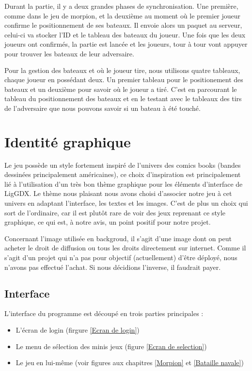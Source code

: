 \documentclass{report}
\begin{document}
Durant la partie, il y a deux grandes phases de synchronisation. Une première, comme dans le jeu de morpion, et la deuxième au moment où le premier joueur confirme le positionnement
de ses bateaux. Il envoie alors un paquet au serveur, celui-ci va stocker l’ID et le tableau des bateaux du joueur. Une fois que les deux joueurs ont confirmés, la partie est lancée et les joueurs, tour à tour vont appuyer pour trouver les bateaux
de leur adversaire.\par{}
Pour la gestion des bateaux et où le joueur tire, nous utilisons quatre tableaux, chaque joueur en possédant deux. Un premier tableau pour le positionement des bateaux et un deuxième pour
savoir où le joueur a tiré. C'est en parcourant le tableau du positionnement des bateaux et en le testant avec le tableaux des tirs de l'adversaire que nous pouvons savoir si un bateau
à été touché.

\chapter{Identité graphique}
Le jeu possède un style fortement inspiré de l'univers des comics books (bandes dessinées principalement américaines),
ce choix d'inspiration est principalement lié à l'utilisation d'un très bon thème graphique pour les éléments
d'interface de LigGDX. Le thème nous plaisant nous avons choisi d'associer notre jeu à cet univers en adaptant l'interface, les
textes et les images. C'est de plus un choix qui sort de l'ordinaire, car il est plutôt rare de voir des jeux
reprenant ce style graphique, ce qui est, à notre avis, un point positif pour notre projet.
\par
Concernant l'image utilisée en backgroud, il s'agit d'une image dont on peut acheter le droit de diffusion ou tous les droits directement sur internet. Comme il s'agit d'un projet qui n'a pas pour objectif (actuellement) d'être déployé, nous n'avons pas effectué l'achat. Si nous décidions l'inverse, il faudrait payer.

\section{Interface}
L'interface du programme est découpé en trois parties principales :

\begin{itemize}
  \item L'écran de login (firgure \ref{Ecran de login})
  \item Le menu de sélection des minis jeux (figure \ref{Ecran de selection})
  \item Le jeu en lui-même (voir figures aux chapitres \ref{Morpion} et \ref{Bataille navale})
\end{itemize}
\end{document}
